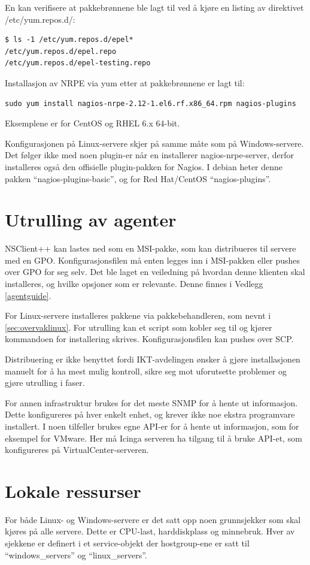 En kan verifisere at pakkebrønnene ble lagt til ved å kjøre en listing av direktivet /etc/yum.repos.d/:
\begin{lstlisting}[style=example]
$ ls -1 /etc/yum.repos.d/epel*
/etc/yum.repos.d/epel.repo
/etc/yum.repos.d/epel-testing.repo
\end{lstlisting}

Installasjon av NRPE via yum etter at pakkebrønnene er lagt til:
\begin{lstlisting}[style=example]
sudo yum install nagios-nrpe-2.12-1.el6.rf.x86_64.rpm nagios-plugins
\end{lstlisting}

Eksemplene er for CentOS og RHEL 6.x 64-bit.

Konfigurasjonen på Linux-servere skjer på samme måte som på Windows-servere. Det følger ikke med noen plugin-er når en installerer nagios-nrpe-server, derfor installeres også den offisielle plugin-pakken for Nagios. I debian heter denne pakken ``nagios-plugins-basic'', og for Red Hat/CentOS ``nagios-plugins''.

\section{Utrulling av agenter}
NSClient++ kan lastes ned som en MSI-pakke, som kan distribueres til servere med en GPO. Konfigurasjonsfilen må enten legges inn i MSI-pakken eller pushes over GPO for seg selv. Det ble laget en veiledning på hvordan denne klienten skal installeres, og hvilke opsjoner som er relevante. Denne finnes i Vedlegg \ref{agentguide}.

For Linux-servere installeres pakkene via pakkebehandleren, som nevnt i \ref{sec:overvaklinux}. For utrulling kan et script som kobler seg til og kjører kommandoen for installering skrives. Konfigurasjonsfilen kan pushes over SCP.

Distribuering er ikke benyttet fordi IKT-avdelingen ønsker å gjøre installasjonen manuelt for å ha mest mulig kontroll, sikre seg mot uforutsette problemer og gjøre utrulling i faser.
 
For annen infrastruktur brukes for det meste SNMP for å hente ut informasjon. Dette konfigureres på hver enkelt enhet, og krever ikke noe ekstra programvare installert. I noen tilfeller brukes egne API-er for å hente ut informasjon, som for eksempel for VMware. Her må Icinga serveren ha tilgang til å bruke API-et, som konfigureres på VirtualCenter-serveren.

\section{Lokale ressurser}\label{sec:lokaleressurser}
For både Linux- og Windows-servere er det satt opp noen grunnsjekker som skal kjøres på alle servere. Dette er CPU-last, harddiskplass og minnebruk. Hver av sjekkene er definert i et service-objekt der hostgroup-ene er satt til ``windows\_servers'' og ``linux\_servers''. 

